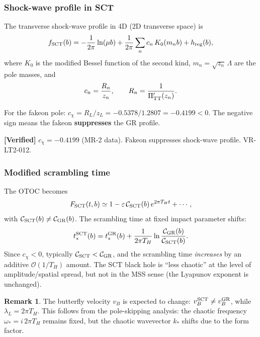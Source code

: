 \documentclass[11pt,a4paper]{article}
\renewcommand{\order}{\mathcal{O}}
\theoremstyle{plain}
\theoremstyle{definition}
\newtheorem{remark}[theorem]{Remark}
\newcommand{\verified}[1]{%
  \par\smallskip\noindent
  \colorbox{green!10}{\parbox{\dimexpr\linewidth-2\fboxsep}{%
    \textcolor{green!50!black}{\textbf{[Verified]}} #1}}%
  \par\smallskip}
\begin{document}
\subsubsection{Shock-wave profile in SCT}

The transverse shock-wave profile in 4D (2D transverse space) is
\begin{equation}
\label{eq:f-sct}
f_{\rm SCT}(b) = -\frac{1}{2\pi}\ln(\mu b)
  + \frac{1}{2\pi}\sum_n c_n\,K_0(m_n b) + h_{\rm reg}(b),
\end{equation}
where $K_0$ is the modified Bessel function of the second kind,
$m_n = \sqrt{z_n}\,\Lambda$ are the pole masses, and
\begin{equation}
c_n = \frac{R_n}{z_n}, \qquad R_n = \frac{1}{\Pi'_{\rm TT}(z_n)}.
\end{equation}

For the fakeon pole: $c_\chi = R_L/z_L = -0.5378/1.2807 = -0.4199 < 0$.
The negative sign means the fakeon \textbf{suppresses} the GR profile.

\verified{$c_\chi = -0.4199$ (MR-2 data). Fakeon suppresses
  shock-wave profile.  VR-LT2-012.}

\subsubsection{Modified scrambling time}

The OTOC becomes
\begin{equation}
F_{\rm SCT}(t,b) \simeq 1 - \varepsilon\,\mathcal{C}_{\rm SCT}(b)\,
  e^{2\pi T_H t} + \cdots,
\end{equation}
with $\mathcal{C}_{\rm SCT}(b) \neq \mathcal{C}_{\rm GR}(b)$.
The scrambling time at fixed impact parameter shifts:
\begin{equation}
t_s^{\rm SCT}(b) = t_s^{\rm GR}(b)
  + \frac{1}{2\pi T_H}\ln\frac{\mathcal{C}_{\rm GR}(b)}%
    {\mathcal{C}_{\rm SCT}(b)}.
\end{equation}
Since $c_\chi < 0$, typically $\mathcal{C}_{\rm SCT} < \mathcal{C}_{\rm GR}$,
and the scrambling time \emph{increases} by an additive $\order(1/T_H)$ amount.
The SCT black hole is ``less chaotic'' at the level of amplitude/spatial spread,
but not in the MSS sense (the Lyapunov exponent is unchanged).

\begin{remark}
The butterfly velocity $v_B$ is expected to change:
$v_B^{\rm SCT} \neq v_B^{\rm GR}$, while $\lambda_L = 2\pi T_H$.
This follows from the pole-skipping analysis: the chaotic frequency
$\omega_* = i\,2\pi T_H$ remains fixed, but the chaotic wavevector
$k_*$ shifts due to the form factor.
\end{remark}
\end{document}

